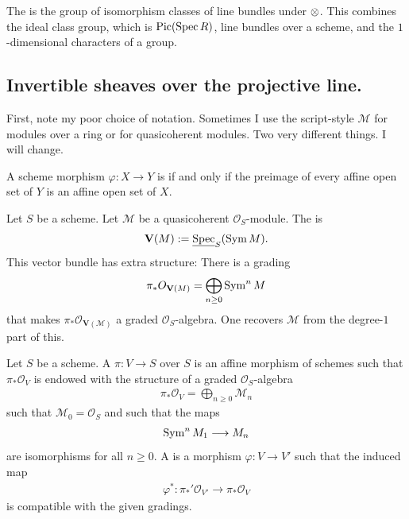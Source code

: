 \documentclass [11 pt, oneside] {article}
\begin{document}
The  is the group of isomorphism classes of line bundles under $\otimes$. This combines the ideal class group, which is $\operatorname{Pic}(\operatorname{Spec} R)$, line bundles over a scheme, and the $1$-dimensional characters of a group.

\subsection{Invertible sheaves over the projective line.}
First, note my poor choice of notation. Sometimes I use the script-style $\mathscr{M}$ for modules over a ring or for quasicoherent modules. Two very different things. I will change.

\begin{definition}\label{}\text{}
A scheme morphism $\varphi : X\longrightarrow Y$ is  if and only if the preimage of every affine open set of $Y$ is an affine open set of $X$.
\end{definition}

\begin{definition}\label{}\text{}
Let $S$ be a scheme. Let $\mathscr{M}$ be a quasicoherent $\mathscr{O}_S$-module. The  is
\begin{align*}
	\mathbf{V}(\relax{M}) := \underline{\operatorname{Spec}}_S(\operatorname{Sym} \relax{M}).
\end{align*}
This vector bundle has extra structure: There is a grading
\begin{align*}
	\pi_* \relax{O}_{\mathbf{V}(\relax{M})} = \bigoplus_{n\ge 0}\operatorname{Sym} ^n \relax{M}
\end{align*}
that makes $\pi_*\mathscr{O}_{\mathbf{V}(\mathscr{M})}$ a graded $\mathscr{O}_S$-algebra. One recovers $\mathscr{M}$ from the degree-$1$ part of this. 
\end{definition}

\begin{definition}\label{}\text{}
Let $S$ be a scheme. A  $\pi:V\longrightarrow S$ over $S$ is an affine morphism of schemes such that $\pi_* \mathscr{O}_V$ is endowed with the structure of a graded $\mathscr{O}_S$-algebra 
\begin{align*}
	\pi_*\mathscr{O}_V = \bigoplus_{n\ge 0}\mathscr{M}_n
\end{align*}
such that $\mathscr{M}_0=\mathscr{O}_S$ and such that the maps
\begin{align*}
	\operatorname{Sym}^n \relax{M}_1\longrightarrow \relax{M}_n
\end{align*}
are isomorphisms for all $n\ge 0$. A   is a morphism $\varphi : V\longrightarrow V'$ such that the induced map
\begin{align*}
	\varphi^* : \pi_*' \mathscr{O}_{V'}\longrightarrow \pi_*\mathscr{O}_V
\end{align*}
is compatible with the given gradings.
\end{definition}
\end{document}
